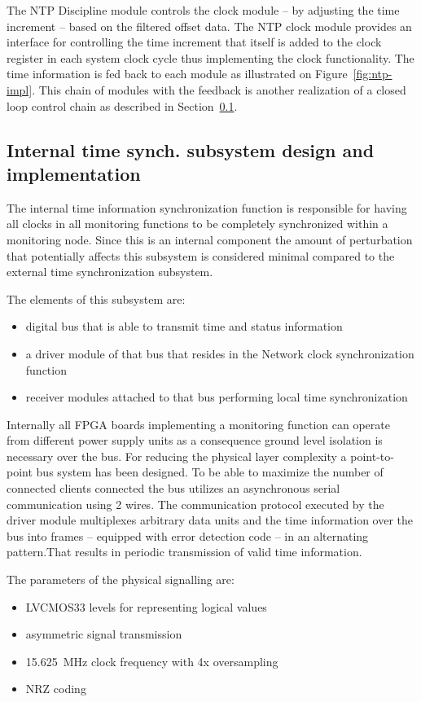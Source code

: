 \documentclass[journal]{IEEEtran}
\begin{document}
The NTP Discipline module controls the clock module -- by adjusting the time increment -- based on the filtered offset
data. The NTP clock module provides an interface for controlling the time increment that itself is added to the clock
register in each system clock cycle thus
implementing the clock functionality. The time information is fed back to each module as illustrated on
Figure~\ref{fig:ntp-impl}.
This chain of modules with the feedback is another realization of a closed loop control chain as described in
Section~\ref{sec:Internal-Impl}.

\subsection{Internal time synch. subsystem design and implementation}\label{sec:Internal-Impl}

The internal time information synchronization function is responsible for having all clocks in all monitoring functions
to be completely synchronized within a monitoring node. Since this is an internal component the amount of perturbation
that potentially affects this subsystem is considered minimal compared to the external time synchronization subsystem.

The elements of this subsystem are:
\begin{itemize}
    \item digital bus that is able to transmit time and status information
    \item a driver module of that bus that resides in the Network clock synchronization function
    \item receiver modules attached to that bus performing local time synchronization
\end{itemize}

Internally all FPGA boards implementing a monitoring function can operate from different power supply units as a
consequence ground level
isolation is necessary over the bus. For reducing the physical layer complexity
a point-to-point bus system has been designed. To be able to maximize the number of connected clients connected the
bus utilizes an asynchronous serial communication using 2 wires. The communication protocol executed by the driver
module
multiplexes arbitrary data units and the time information over the bus into frames -- equipped with error detection
code --
in an alternating pattern.That results in periodic transmission of valid time information.

The parameters of the physical signalling are:
\begin{itemize}
    \item LVCMOS33 levels for representing logical values
    \item asymmetric signal transmission
    \item \SI{15.625}{\mega\hertz} clock frequency with 4x oversampling
    \item NRZ coding
\end{itemize}
\end{document}
